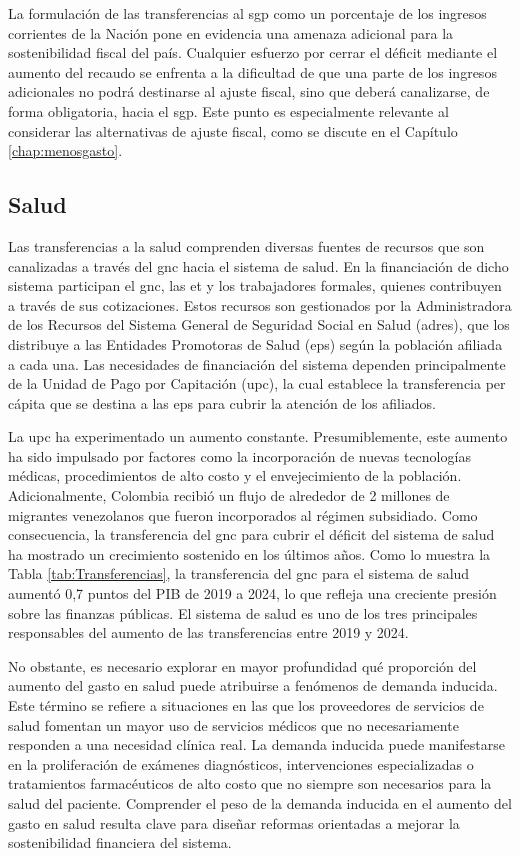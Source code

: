 La formulación de las transferencias al \gls{sgp} como un porcentaje de los ingresos corrientes de la Nación pone en evidencia una amenaza adicional para la sostenibilidad fiscal del país. Cualquier esfuerzo por cerrar el déficit mediante el aumento del recaudo se enfrenta a la dificultad de que una parte de los ingresos adicionales no podrá destinarse al ajuste fiscal, sino que deberá canalizarse, de forma obligatoria, hacia el \gls{sgp}. Este punto es especialmente relevante al considerar las alternativas de ajuste fiscal, como se discute en el Capítulo \ref{chap:menosgasto}.

\subsection{Salud}

Las transferencias a la salud comprenden diversas fuentes de recursos que son canalizadas a través del \gls{gnc} hacia el sistema de salud. En la financiación de dicho sistema participan el \gls{gnc}, las \gls{et} y los trabajadores formales, quienes contribuyen a través de sus cotizaciones. Estos recursos son gestionados por la Administradora de los Recursos del Sistema General de Seguridad Social en Salud (\gls{adres}), que los distribuye a las Entidades Promotoras de Salud (\gls{eps}) según la población afiliada a cada una. Las necesidades de financiación del sistema dependen principalmente de la Unidad de Pago por Capitación (\gls{upc}), la cual establece la transferencia per cápita que se destina a las \gls{eps} para cubrir la atención de los afiliados. 

La \gls{upc} ha experimentado un aumento constante. Presumiblemente, este aumento ha sido impulsado por factores como la incorporación de nuevas tecnologías médicas, procedimientos de alto costo y el envejecimiento de la población. Adicionalmente, Colombia recibió un flujo de alrededor de 2 millones de migrantes venezolanos que fueron incorporados al régimen subsidiado. Como consecuencia, la transferencia del \gls{gnc} para cubrir el déficit del sistema de salud ha mostrado un crecimiento sostenido en los últimos años. Como lo muestra la Tabla \ref{tab:Transferencias}, la transferencia del \gls{gnc} para el sistema de salud aumentó 0,7 puntos del PIB de 2019 a 2024, lo que refleja una creciente presión sobre las finanzas públicas. El sistema de salud es uno de los tres principales responsables del aumento de las transferencias entre 2019 y 2024. 

No obstante, es necesario explorar en mayor profundidad qué proporción del aumento del gasto en salud puede atribuirse a fenómenos de demanda inducida. Este término se refiere a situaciones en las que los proveedores de servicios de salud fomentan un mayor uso de servicios médicos que no necesariamente responden a una necesidad clínica real. La demanda inducida puede manifestarse en la proliferación de exámenes diagnósticos, intervenciones especializadas o tratamientos farmacéuticos de alto costo que no siempre son necesarios para la salud del paciente. Comprender el peso de la demanda inducida en el aumento del gasto en salud resulta clave para diseñar reformas orientadas a mejorar la sostenibilidad financiera del sistema.

